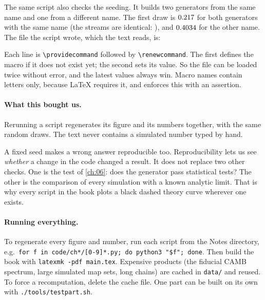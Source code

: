 \label{0a:ex:results}
The same script also checks the seeding. It builds two generators from the
same name and one from a different name. The first draw is $0.217$
for both generators with the same name (the streams are identical:
\SeedIdentical), and $0.4034$ for the other name. The file the
script wrote, which the text reads, is:


Each line is \verb|\providecommand| followed by \verb|\renewcommand|. The
first defines the macro if it does not exist yet; the second sets its value.
So the file can be loaded twice without error, and the latest values always
win. Macro names contain letters only, because \LaTeX{} requires it, and
 enforces this with an assertion.

\paragraph{What this bought us.}
Rerunning a script regenerates its figure and its numbers together, with the
same random draws. The text never contains a simulated number typed by hand.

\begin{pitfall}
A fixed seed makes a wrong answer reproducible too. Reproducibility lets us
see \emph{whether} a change in the code changed a result. It does not replace
two other checks. One is the test of \cref{ch:06}: does the generator pass
statistical tests? The other is the comparison of every simulation with a
known analytic limit. That is why every script in the book plots a black
dashed theory curve wherever one exists.
\end{pitfall}

\paragraph{Running everything.}
To regenerate every figure and number, run each script from the Notes
directory, e.g.\ \texttt{for f in code/ch*/[0-9]*.py; do python3 "\$f"; done}.
Then build the book with \texttt{latexmk -pdf main.tex}. Expensive products
(the fiducial CAMB spectrum, large simulated map sets, long chains) are cached
in \texttt{data/} and reused. To force a recomputation, delete the cache file.
One part can be built on its own with \texttt{./tools/testpart.sh}.

